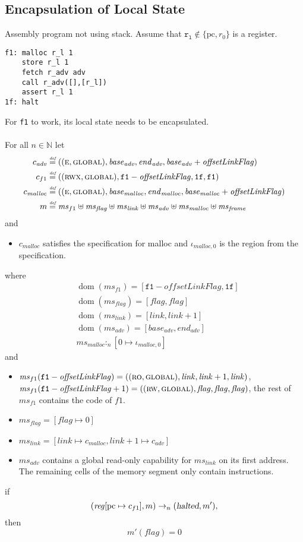 \documentclass[a4paper]{article}
\newcommand{\forcenewline}{$\phantom{v}$\\}
\newcommand{\update}[2]{[#1 \mapsto #2]}
\newcommand{\defeq}{\stackrel{\textit{\tiny{def}}}{=}}
\DeclareMathOperator{\dom}{dom}
\newcommand{\var}[1]{\mathit{#1}}
\newcommand{\hs}{\var{ms}}
\newcommand{\ms}{\hs}
\newcommand{\pcreg}{\mathrm{pc}}
\newcommand{\start}{\var{base}}
\newcommand{\addrend}{\var{end}}
\newcommand{\reg}{\var{reg}}
\newcommand{\heap}{\var{mem}}
\newcommand{\adv}{\var{adv}}
\newcommand{\link}{\var{link}}
\newcommand{\flag}{\var{flag}}
\newcommand{\olf}{\var{offsetLinkFlag}}
\newcommand{\halted}{\textsl{halted}}
\newcommand{\heapSat}[3][\heap]{#1 :_{#2} #3}
\newcommand{\codelabel}[1]{\mathit{#1}}
\newcommand{\malloc}{\codelabel{malloc}}
\newcommand{\nats}{\mathbb{N}}
\newcommand{\plainperm}[1]{\textsc{#1}}
\newcommand{\readonly}{\plainperm{ro}}
\newcommand{\readwrite}{\plainperm{rw}}
\newcommand{\entry}{\plainperm{e}}
\newcommand{\rwx}{\plainperm{rwx}}
\newcommand{\glob}{\plainperm{global}}
\newcommand{\step}[1][]{\rightarrow_{#1}}
\begin{document}
\subsection{Encapsulation of Local State}
Assembly program not using stack. Assume that $\mathtt{r_l} \not\in \{\pcreg,r_0 \}$ is a register.
\begin{verbatim}
f1: malloc r_l 1
    store r_l 1
    fetch r_adv adv
    call r_adv([],[r_l])
    assert r_l 1
1f: halt
\end{verbatim}
For \texttt{f1} to work, its local state needs to be encapsulated. 
\begin{lemma} \forcenewline
  \label{lem:correctness-f1}
  For all $n \in \nats$
  let
  \begin{align*}
    c_{\var{adv}} & \defeq ((\entry,\glob),\start_{\adv},\addrend_{\adv},\start_{\adv}+\olf) \\
    c_{f1} & \defeq ((\rwx,\glob),\mathtt{f1}-\olf,\mathtt{1f},\mathtt{f1}) \\
    c_\malloc & \defeq ((\entry,\glob),\start_\malloc,\addrend_\malloc,\start_\malloc+\olf) \\
    m & \defeq \hs_{f1} \uplus 
        \hs_\flag \uplus                
        \ms_{\var{link}} \uplus 
        \hs_\adv \uplus 
        \ms_{\malloc} \uplus 
        \hs_{\var{frame}} 
  \end{align*}
  and
  \begin{itemize}
  \item $c_\malloc$ satisfies the specification for malloc and $\iota_{\malloc,0}$ is the region from the specification.
  \end{itemize}
  where 
  \begin{align*}
    &\dom(\hs_{f1}) = [\mathtt{f1}-\olf,\mathtt{1f}] \\
    &\dom(\hs_\flag) = [\flag,\flag] \\
    &\dom(\ms_\link) = [\link,\link+1]\\
    &\dom(\hs_{\adv}) = [\start_\adv,\addrend_\adv] \\
    &\heapSat[\hs_{\malloc}]{n}{[0 \mapsto \iota_{\malloc,0}]}
  \end{align*}
  and
  \begin{itemize}
  \item $\ms_{f1}(\mathtt{f1}-\olf) = ((\readonly,\glob),\link,\link+1,\link)$, $\ms_{f1}(\mathtt{f1}-\olf+1) = ((\readwrite,\glob),\flag,\flag,\flag)$, the rest of $\hs_{f1}$ contains the code of $f1$.
  \item $\ms_\flag = [\flag \mapsto 0]$
  \item $\ms_{\var{link}} = [\var{link} \mapsto c_\malloc, \var{link} + 1 \mapsto c_\adv]$
  \item $\hs_\adv$ contains a global read-only capability for $\hs_\link$ on its first address. The remaining cells of the memory segment only contain instructions.
  \end{itemize}
  if 
  \[
    (\reg\update{\pcreg}{c_{f1}},m) \step[n] (\halted,m'),
  \]
  then
  \[
    m'(\flag) = 0
  \]  
\end{lemma}
\end{document}
